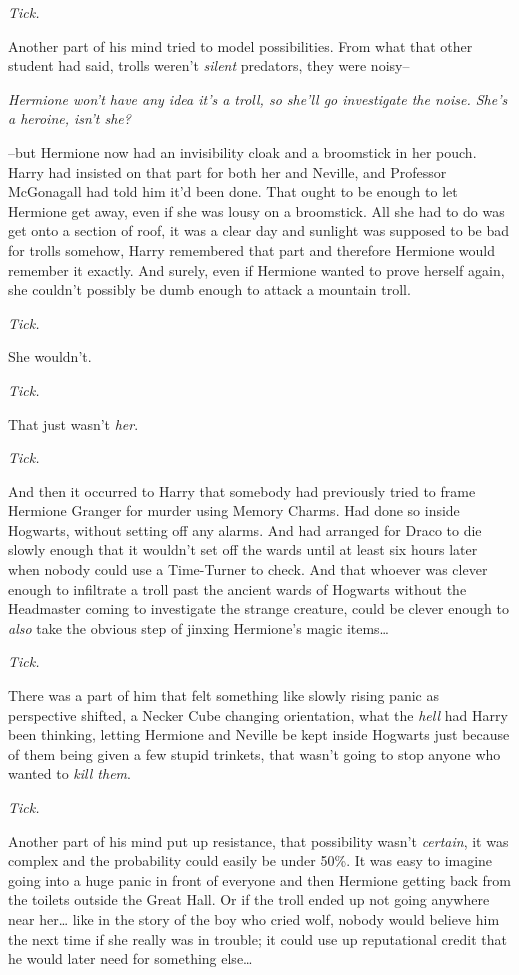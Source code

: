 \emph{Tick.}

Another part of his mind tried to model possibilities. From what that other student had said, trolls weren't \emph{silent} predators, they were noisy\---

\emph{Hermione won't have any idea it's a troll, so she'll go investigate the noise. She's a heroine, isn't she?}

\---but Hermione now had an invisibility cloak and a broomstick in her pouch. Harry had insisted on that part for both her and Neville, and Professor McGonagall had told him it'd been done. That ought to be enough to let Hermione get away, even if she was lousy on a broomstick. All she had to do was get onto a section of roof, it was a clear day and sunlight was supposed to be bad for trolls somehow, Harry remembered that part and therefore Hermione would remember it exactly. And surely, even if Hermione wanted to prove herself again, she couldn't possibly be dumb enough to attack a mountain troll.

\emph{Tick.}

She wouldn't.

\emph{Tick.}

That just wasn't \emph{her}.

\emph{Tick.}

And then it occurred to Harry that somebody had previously tried to frame Hermione Granger for murder using Memory Charms. Had done so inside Hogwarts, without setting off any alarms. And had arranged for Draco to die slowly enough that it wouldn't set off the wards until at least six hours later when nobody could use a Time-Turner to check. And that whoever was clever enough to infiltrate a troll past the ancient wards of Hogwarts without the Headmaster coming to investigate the strange creature, could be clever enough to \emph{also} take the obvious step of jinxing Hermione's magic items{\ldots}

\emph{Tick.}

There was a part of him that felt something like slowly rising panic as perspective shifted, a Necker Cube changing orientation, what the \emph{hell} had Harry been thinking, letting Hermione and Neville be kept inside Hogwarts just because of them being given a few stupid trinkets, that wasn't going to stop anyone who wanted to \emph{kill them}.

\emph{Tick.}

Another part of his mind put up resistance, that possibility wasn't \emph{certain}, it was complex and the probability could easily be under 50\%. It was easy to imagine going into a huge panic in front of everyone and then Hermione getting back from the toilets outside the Great Hall. Or if the troll ended up not going anywhere near her{\ldots} like in the story of the boy who cried wolf, nobody would believe him the next time if she really was in trouble; it could use up reputational credit that he would later need for something else{\ldots}


